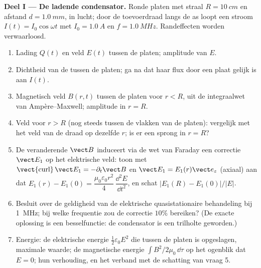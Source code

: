 \begin{problem}
\label{pb:b2:maxwell-equations:1}

\medskip
\noindent\textbf{Deel I --- De ladende condensator.}
Ronde platen met straal $R = \qty{10}{cm}$ en afstand $d = \qty{1.0}{mm}$,
in lucht; door de toevoerdraad langs de as loopt een stroom
$I(t) = I_0\cos\omega t$ met $I_0 = \qty{1.0}{A}$ en $f = \qty{1.0}{MHz}$.
Randeffecten worden verwaarloosd.
\begin{enumerate}
  \item Lading $Q(t)$ en veld $E(t)$ tussen de platen; amplitude van $E$.
  \item Dichtheid van de  tussen de platen; ga na dat
        haar flux door een plaat gelijk is aan $I(t)$.
  \item Magnetisch veld $B(r, t)$ tussen de platen voor $r < R$, uit de
        integraalwet van Ampère--Maxwell; amplitude in $r = R$.
  \item Veld voor $r > R$ (nog steeds tussen de vlakken van de platen):
        vergelijk met het veld van de draad op dezelfde $r$; is er een
        sprong in $r = R$?
  \item De veranderende $\vect B$ induceert via de wet van Faraday een
        correctie $\vect E_1$ op het elektrische veld: toon met
        $\operatorname{\vect{curl}}\vect E_1
        = -\partial_t\vect B$ en
        $\vect E_1 = E_1(r)\vect e_z$ (axiaal) aan dat
        $E_1(r) - E_1(0) = \dfrac{\mu_0\varepsilon_0r^2}4\,\dfrac{\dd^2E}{\dd t^2}$,
        en schat $|E_1(R) - E_1(0)|/|E|$.
  \item Besluit over de geldigheid van de elektrische quasistationaire
        behandeling bij \qty{1}{MHz}; bij welke frequentie zou de correctie
        $10\%$ bereiken? (De exacte oplossing is een besselfunctie: de
        condensator is een trilholte geworden.)
  \item Energie: de elektrische energie $\tfrac12\varepsilon_0E^2$ die
        tussen de platen is opgeslagen, maximale waarde; de magnetische
        energie $\int B^2/2\mu_0\,\dd\tau$ op het ogenblik dat $E = 0$; hun
        verhouding, en het verband met de schatting van vraag 5.
\end{enumerate}


\end{problem}
